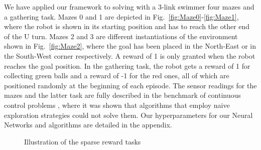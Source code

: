 \documentclass{article} %
\begin{document}
We have applied our framework to solving with a 3-link swimmer four mazes and a gathering task. Mazes 0 and 1 are depicted in Fig.\ \ref{fig:Maze0}-\ref{fig:Maze1}, where the robot is shown in its starting position and has to reach the other end of the U turn. Mazes 2 and 3 are different instantiations of the environment shown in Fig.\ \ref{fig:Maze2}, where the goal has been placed in the North-East or in the South-West corner respectively. A reward of 1 is only granted when the robot reaches the goal position. In the gathering task, the robot gets a reward of 1 for collecting green balls and a reward of -1 for the red ones, all of which are positioned randomly at the beginning of each episode. The sensor readings for the mazes and the latter task are fully described in the benchmark of continuous control problems \citep{duan2016benchmarking}, where it was shown that algorithms that employ naive exploration strategies could not solve them. Our hyperparameters for our Neural Networks and algorithms are detailed in the appendix.

\begin{figure}[h!]
	\centering
	\caption{Illustration of the sparse reward tasks}
	\label{fig:snn_multimodal_MI}
\end{figure}
\end{document}
